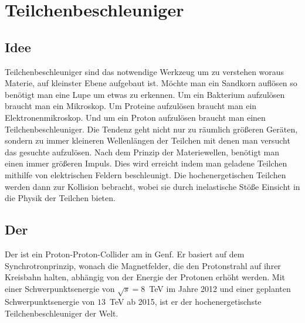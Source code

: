 \section{Teilchenbeschleuniger}
\subsection{Idee}
Teilchenbeschleuniger sind das notwendige Werkzeug um zu verstehen woraus Materie, auf kleinster Ebene aufgebaut ist. Möchte man ein Sandkorn auflösen so benötigt man eine Lupe um etwas zu erkennen. Um ein Bakterium aufzulösen braucht man ein Mikroskop. Um Proteine aufzulösen braucht man ein Elektronenmikroskop. Und um ein Proton aufzulösen braucht man einen Teilchenbeschleuniger. Die Tendenz geht nicht nur zu räumlich größeren Geräten, sondern zu immer kleineren Wellenlängen der Teilchen mit denen man versucht das gesuchte aufzulösen. Nach dem Prinzip der Materiewellen, benötigt man einen immer größeren Impuls. Dies wird erreicht indem man geladene Teilchen mithilfe von elektrischen Feldern beschleunigt. Die hochenergetischen Teilchen werden dann zur Kollision bebracht, wobei sie durch inelastische Stöße Einsicht in die Physik der Teilchen bieten.
\subsection{Der \lhc}
Der \lhc ist ein Proton-Proton-Collider am \cern in Genf. Er basiert auf dem Synchrotronprinzip, wonach die Magnetfelder, die den Protonstrahl auf ihrer Kreisbahn halten, abhängig von der Energie der Protonen erhöht werden. Mit einer Schwerpunktsenergie von $\sqrt{s} = 8$~TeV im Jahre 2012 und einer geplanten Schwerpunktsenergie von $13$~TeV ab 2015, ist er der hochenergetischste Teilchenbeschleuniger der Welt. 

